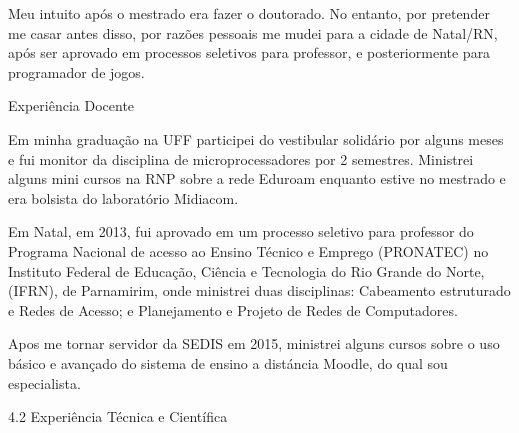 \documentclass[10pt,a4paper,oneside]{book}
\begin{document}
Meu intuito após o mestrado era fazer o doutorado. No entanto, por pretender me casar antes disso, 
por razões pessoais me mudei para a cidade de Natal/RN, após ser aprovado em processos seletivos 
para professor, e posteriormente para programador de jogos.


Experiência Docente

Em minha graduação na UFF participei do vestibular solidário por alguns meses e fui monitor da 
disciplina de microprocessadores por 2 semestres. Ministrei alguns mini cursos na RNP sobre a rede 
Eduroam enquanto estive no mestrado e era bolsista do laboratório Midiacom.

Em Natal, em 2013, fui aprovado em um processo seletivo para professor do Programa Nacional de acesso 
ao Ensino Técnico e Emprego (PRONATEC) no Instituto Federal de Educação, Ciência e Tecnologia do Rio 
Grande do Norte, (IFRN), de Parnamirim, onde ministrei duas disciplinas:  Cabeamento estruturado e 
Redes de Acesso; e Planejamento e Projeto de Redes de Computadores.

Apos me tornar servidor da SEDIS em 2015, ministrei alguns cursos sobre o uso básico e avançado do 
sistema de ensino a distáncia Moodle, do qual sou especialista.


4.2      Experiência Técnica e Científica
\end{document}
